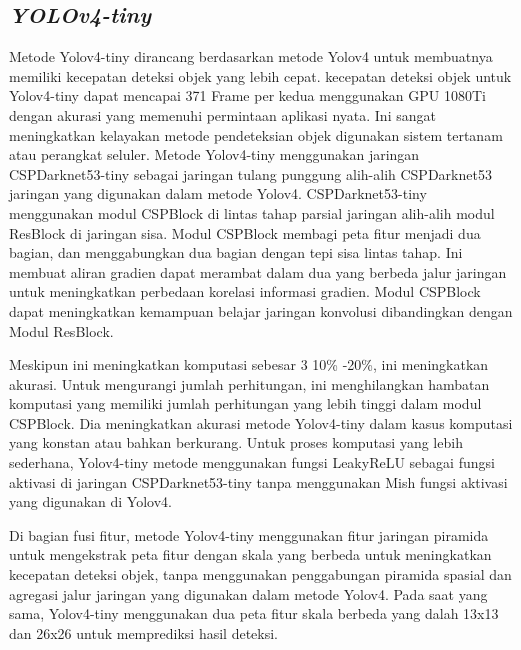 \subsection{\textit{YOLOv4-tiny}}
Metode Yolov4-tiny dirancang berdasarkan metode Yolov4 untuk membuatnya memiliki kecepatan deteksi objek yang lebih cepat. kecepatan deteksi objek untuk Yolov4-tiny dapat mencapai 371 Frame per kedua menggunakan GPU 1080Ti dengan akurasi yang memenuhi permintaan aplikasi nyata. Ini sangat meningkatkan kelayakan metode pendeteksian objek digunakan sistem tertanam atau perangkat seluler. Metode Yolov4-tiny menggunakan jaringan CSPDarknet53-tiny sebagai jaringan tulang punggung alih-alih CSPDarknet53 jaringan yang digunakan dalam metode Yolov4. CSPDarknet53-tiny menggunakan modul CSPBlock di lintas tahap parsial jaringan alih-alih modul ResBlock di jaringan sisa. Modul CSPBlock membagi peta fitur menjadi dua bagian, dan menggabungkan dua bagian dengan tepi sisa lintas tahap. Ini membuat aliran gradien dapat merambat dalam dua yang berbeda jalur jaringan untuk meningkatkan perbedaan korelasi informasi gradien. Modul CSPBlock dapat meningkatkan kemampuan belajar jaringan konvolusi dibandingkan dengan Modul ResBlock.\citep{jiang2020real}

Meskipun ini meningkatkan komputasi sebesar 3
10\% -20\%, ini meningkatkan akurasi. Untuk mengurangi jumlah
perhitungan, ini menghilangkan hambatan komputasi yang
memiliki jumlah perhitungan yang lebih tinggi dalam modul CSPBlock. Dia meningkatkan akurasi metode Yolov4-tiny dalam kasus komputasi yang konstan atau bahkan berkurang.
Untuk proses komputasi yang lebih sederhana, Yolov4-tiny
metode menggunakan fungsi LeakyReLU sebagai fungsi aktivasi
di jaringan CSPDarknet53-tiny tanpa menggunakan Mish
fungsi aktivasi yang digunakan di Yolov4.\citep{jiang2020real}

Di bagian fusi fitur, metode Yolov4-tiny menggunakan
fitur jaringan piramida untuk mengekstrak peta fitur dengan
skala yang berbeda untuk meningkatkan kecepatan deteksi objek, tanpa menggunakan penggabungan piramida spasial dan agregasi jalur jaringan yang digunakan dalam metode Yolov4. Pada saat yang sama, Yolov4-tiny menggunakan dua peta fitur skala berbeda yang  dalah 13x13 dan 26x26 untuk memprediksi hasil deteksi.\citep{jiang2020real}

